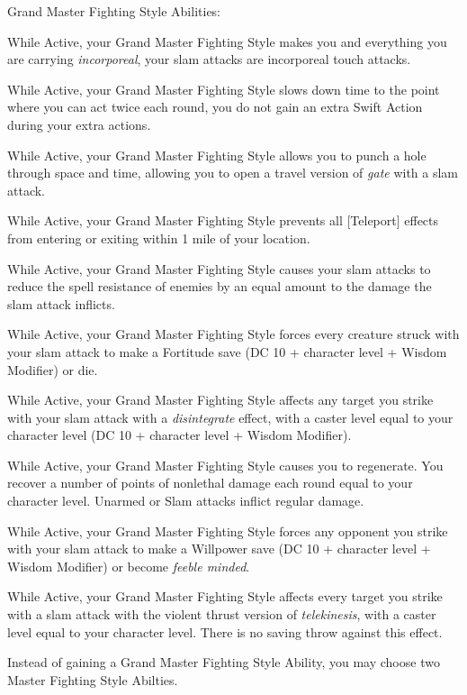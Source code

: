 Grand Master Fighting Style Abilities:
\begin{itemize*}
\item While Active, your Grand Master Fighting Style makes you and everything 
you are carrying \textit{incorporeal}, your slam attacks are incorporeal touch 
attacks.
\item While Active, your Grand Master Fighting Style slows down time to the point where you can act twice each round, you do not gain an extra Swift Action during your extra actions.
\item While Active, your Grand Master Fighting Style allows you to punch a hole through space and time, allowing you to open a travel version of \textit{gate} with a slam attack.
\item While Active, your Grand Master Fighting Style prevents all [Teleport] effects from entering or exiting within 1 mile of your location.
\item While Active, your Grand Master Fighting Style causes your slam attacks to reduce the spell resistance of enemies by an equal amount to the damage the slam attack inflicts.
\item While Active, your Grand Master Fighting Style forces every creature struck with your slam attack to make a Fortitude save (DC 10 +  character level + Wisdom Modifier) or die.
\item While Active, your Grand Master Fighting Style affects any target you strike with your slam attack with a \textit{disintegrate} effect, with a caster level equal to your character level (DC 10 +  character level + Wisdom Modifier).
\item While Active, your Grand Master Fighting Style causes you to regenerate. You recover a number of points of nonlethal damage each round equal to your character level. Unarmed or Slam attacks inflict regular damage.
\item While Active, your Grand Master Fighting Style forces any opponent you strike with your slam attack to make a Willpower save (DC 10 +  character level + Wisdom Modifier) or become \textit{feeble minded}.
\item While Active, your Grand Master Fighting Style affects every target you strike with a slam attack with the violent thrust version of \textit{telekinesis}, with a caster level equal to your character level. There is no saving throw against this effect.
\item Instead of gaining a Grand Master Fighting Style Ability, you may choose two Master Fighting Style Abilties.
\end{itemize*}

